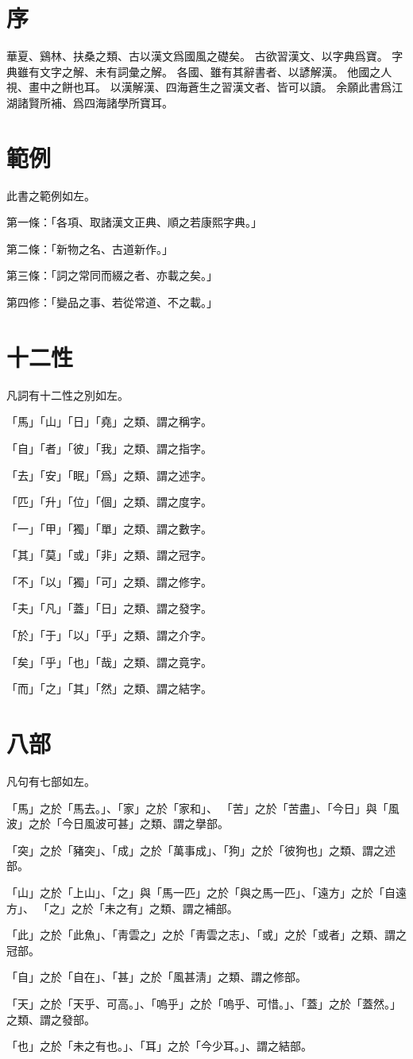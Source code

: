 \section{序}
華夏、鷄林、扶桑之類、古以漢文爲國風之礎矣。
古欲習漢文、以字典爲寶。
字典雖有文字之解、未有詞彙之解。
各國、雖有其辭書者、以諺解漢。
他國之人視、畫中之餅也耳。
以漢解漢、四海蒼生之習漢文者、皆可以讀。
余願此書爲江湖諸賢所補、爲四海諸學所寶耳。
\section{範例}
此書之範例如左。
\par 第一條：「各項、取諸漢文正典、順之若康熙字典。」
\par 第二條：「新物之名、古道新作。」
\par 第三條：「詞之常同而綴之者、亦載之矣。」
\par 第四修：「變品之事、若從常道、不之載。」
\section{十二性}
\par 凡詞有十二性之別如左。
\par 「馬」「山」「日」「堯」之類、謂之稱字。
\par 「自」「者」「彼」「我」之類、謂之指字。
\par 「去」「安」「眠」「爲」之類、謂之述字。
\par 「匹」「升」「位」「個」之類、謂之度字。
\par 「一」「甲」「獨」「單」之類、謂之數字。
\par 「其」「莫」「或」「非」之類、謂之冠字。
\par 「不」「以」「獨」「可」之類、謂之修字。
\par 「夫」「凡」「蓋」「日」之類、謂之發字。
\par 「於」「于」「以」「乎」之類、謂之介字。
\par 「矣」「乎」「也」「哉」之類、謂之竟字。
\par 「而」「之」「其」「然」之類、謂之結字。
\section{八部}
\par 凡句有七部如左。
\par 「馬」之於「馬去。」、「家」之於「家和」、
「苦」之於「苦盡」、「今日」與「風波」之於「今日風波可甚」之類、謂之擧部。
\par 「突」之於「豬突」、「成」之於「萬事成」、「狗」之於「彼狗也」之類、謂之述部。
\par 「山」之於「上山」、「之」與「馬一匹」之於「與之馬一匹」、「遠方」之於「自遠方」、
「之」之於「未之有」之類、謂之補部。
\par 「此」之於「此魚」、「靑雲之」之於「靑雲之志」、「或」之於「或者」之類、謂之冠部。
\par 「自」之於「自在」、「甚」之於「風甚淸」之類、謂之修部。
\par 「天」之於「天乎、可高。」、「嗚乎」之於「嗚乎、可惜。」、「蓋」之於「蓋然。」之類、謂之發部。
\par 「也」之於「未之有也。」、「耳」之於「今少耳。」、謂之結部。
